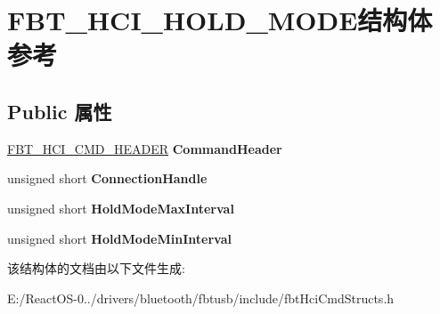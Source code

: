 \hypertarget{struct_f_b_t___h_c_i___h_o_l_d___m_o_d_e}{}\section{F\+B\+T\+\_\+\+H\+C\+I\+\_\+\+H\+O\+L\+D\+\_\+\+M\+O\+D\+E结构体 参考}
\label{struct_f_b_t___h_c_i___h_o_l_d___m_o_d_e}
\subsection*{Public 属性}
\begin{DoxyCompactItemize}
\item 
\mbox{\label{struct_f_b_t___h_c_i___h_o_l_d___m_o_d_e_a8e093e66ff0c0ea19602a75a23ada92a}} 
\hyperlink{struct_f_b_t___h_c_i___c_m_d___h_e_a_d_e_r}{F\+B\+T\+\_\+\+H\+C\+I\+\_\+\+C\+M\+D\+\_\+\+H\+E\+A\+D\+ER} {\bfseries Command\+Header}
\item 
\mbox{\label{struct_f_b_t___h_c_i___h_o_l_d___m_o_d_e_a0a3a4fa1c20585f0214374c156ec77d5}} 
unsigned short {\bfseries Connection\+Handle}
\item 
\mbox{\label{struct_f_b_t___h_c_i___h_o_l_d___m_o_d_e_a25a7ec1bd7ce5847f1bfc8bc1468ce57}} 
unsigned short {\bfseries Hold\+Mode\+Max\+Interval}
\item 
\mbox{\label{struct_f_b_t___h_c_i___h_o_l_d___m_o_d_e_a80056978e3012cb25b026a4187929f9f}} 
unsigned short {\bfseries Hold\+Mode\+Min\+Interval}
\end{DoxyCompactItemize}


该结构体的文档由以下文件生成\+:\begin{DoxyCompactItemize}
\item 
E\+:/\+React\+O\+S-\/0../drivers/bluetooth/fbtusb/include/fbt\+Hci\+Cmd\+Structs.\+h\end{DoxyCompactItemize}
